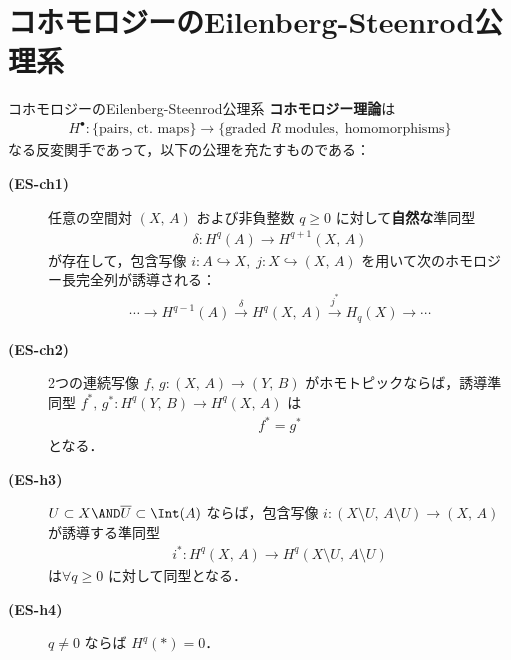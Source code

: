 \documentclass[algtopo_main]{subfiles}
\begin{document}

\section{コホモロジーのEilenberg-Steenrod公理系}

\begin{myaxiom}[label=ax:cohomology]{コホモロジーのEilenberg-Steenrod公理系}
    \textbf{コホモロジー理論}は
    \begin{align}
        H^\bullet \colon \{\text{pairs, ct. maps}\} \longrightarrow \{\text{graded}\; R\; \text{modules},\; \text{homomorphisms}\}
    \end{align}
    なる反変関手であって，以下の公理を充たすものである：
    \begin{description}
        \item[\textbf{(ES-ch1)}] 任意の空間対 $(X,\, A)$ および非負整数 $q \ge 0$ に対して\textbf{自然な}準同型
        \begin{align}
            \delta \colon H^q(A) \longrightarrow H^{q+1}(X,\, A)
        \end{align}
        が存在して，包含写像 $i \colon A \hookrightarrow X,\; j \colon X \hookrightarrow (X,\, A)$ を用いて次のホモロジー長完全列が誘導される：
        \begin{align}
            \cdots \to H^{q-1}(A) \xrightarrow{\delta} H^q(X,\, A) \xrightarrow{j^*} H_q(X) \to \cdots 
        \end{align}
        \item[\textbf{(ES-ch2)}] 2つの連続写像 $f,\, g \colon (X,\, A) \to (Y,\, B)$ がホモトピックならば，誘導準同型 $f^*,\, g^* \colon H^q(Y,\, B) \to H^q(X,\, A)$ は
        \begin{align}
            f^* = g^*
        \end{align}
        となる．
        \item[\textbf{(ES-h3)}]  $U \subset X \AND \overline{U} \subset \Int(A)$ ならば，包含写像 $i \colon (X \setminus U,\, A \setminus U) \longrightarrow (X,\, A)$ が誘導する準同型
        \begin{align}
            i^* \colon H^q(X,\, A) \longrightarrow H^q(X \setminus U,\, A \setminus U)
        \end{align}
        は$\forall q \ge 0$ に対して同型となる．
        \item[\textbf{(ES-h4)}] $q \neq 0$ ならば $H^q(*) = 0$．
    \end{description}
\end{myaxiom}
\end{document}
